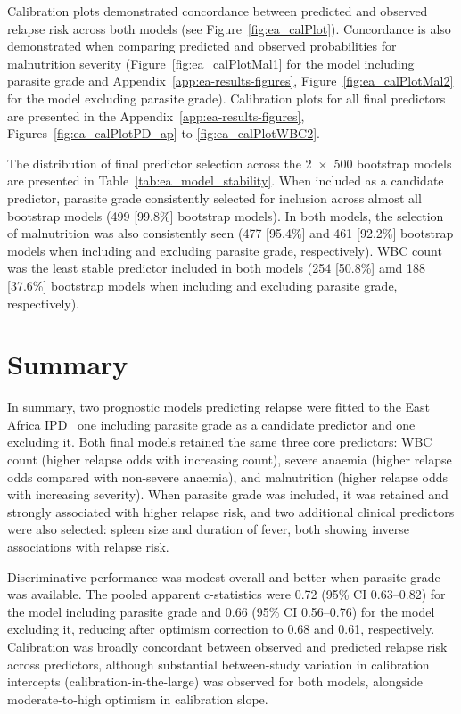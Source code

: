 Calibration plots demonstrated concordance between predicted and observed relapse risk across both models (see Figure~\ref{fig:ea_calPlot}). Concordance is also demonstrated when comparing predicted and observed probabilities for malnutrition severity (Figure~\ref{fig:ea_calPlotMal1} for the model including parasite grade and Appendix~\ref{app:ea-results-figures}, Figure~\ref{fig:ea_calPlotMal2} for the model excluding parasite grade). Calibration plots for all final predictors are presented in the Appendix~\ref{app:ea-results-figures}, Figures~\ref{fig:ea_calPlotPD_ap} to \ref{fig:ea_calPlotWBC2}.

The distribution of final predictor selection across the 2~$\times$~500 bootstrap models are presented in Table~\ref{tab:ea_model_stability}. When included as a candidate predictor, parasite grade consistently selected for inclusion across almost all bootstrap models (499 [99.8\%] bootstrap models). In both models, the selection of malnutrition was also consistently seen (477 [95.4\%] and 461 [92.2\%] bootstrap models when including and excluding parasite grade, respectively). WBC count was the least stable predictor included in both models (254 [50.8\%] amd 188 [37.6\%] bootstrap models when including and excluding parasite grade, respectively).



\section{Summary}

In summary, two prognostic models predicting relapse were fitted to the East Africa IPD \textemdash\ one including parasite grade as a candidate predictor and one excluding it. Both final models retained the same three core predictors: WBC count (higher relapse odds with increasing count), severe anaemia (higher relapse odds compared with non-severe anaemia), and malnutrition (higher relapse odds with increasing severity). When parasite grade was included, it was retained and strongly associated with higher relapse risk, and two additional clinical predictors were also selected: spleen size and duration of fever, both showing inverse associations with relapse risk.

Discriminative performance was modest overall and better when parasite grade was available. The pooled apparent c-statistics were 0.72 (95\% CI 0.63--0.82) for the model including parasite grade and 0.66 (95\% CI 0.56--0.76) for the model excluding it, reducing after optimism correction to 0.68 and 0.61, respectively. Calibration was broadly concordant between observed and predicted relapse risk across predictors, although substantial between-study variation in calibration intercepts (calibration-in-the-large) was observed for both models, alongside moderate-to-high optimism in calibration slope.

